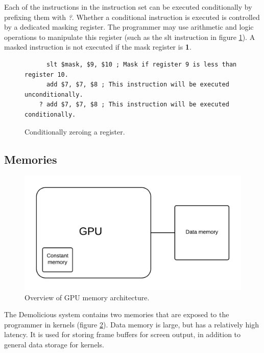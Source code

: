 \documentclass[../main/report.tex]{subfiles}
\begin{document}

Each of the instructions in the instruction set can be executed conditionally by prefixing them with \emph{?}.
Whether a conditional instruction is executed is controlled by a dedicated masking register.
The programmer may use arithmetic and logic operations to manipulate this register (such as the slt instruction in figure \ref{fig:conditional_execution}).
A masked instruction is not executed if the mask register is \textbf{1}.

\begin{figure}[H]
	\centering
	\begin{verbatim}
	  slt $mask, $9, $10 ; Mask if register 9 is less than register 10.
	  add $7, $7, $8 ; This instruction will be executed unconditionally.
	? add $7, $7, $8 ; This instruction will be executed conditionally.
	\end{verbatim}
	\caption{Conditionally zeroing a register.}
	\label{fig:conditional_execution}
\end{figure}

\subsection{Memories}

\begin{figure}[H]
	\centering
	\includegraphics[width=\textwidth]{../system_overview/diagrams/memory_overview.png}
	\caption{Overview of GPU memory architecture.}
	\label{fig:memory_overview}
\end{figure}

The Demolicious system contains two memories that are exposed to the programmer in kernels (figure \ref{fig:memory_overview}).
Data memory is large, but has a relatively high latency.
It is used for storing frame buffers for screen output,
in addition to general data storage for kernels.
\end{document}
